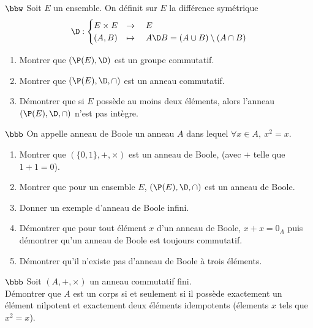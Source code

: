 \documentclass[11pt]{article}
\begin{document}
\pagebreak

\begin{exercice}{$\bbw$}{}
    Soit $E$ un ensemble. On définit sur $E$ la différence symétrique
    \begin{equation*}
        \D : \begin{cases}
            E \times E &\to \quad E\\
            (A,B) &\mapsto \quad A\D B = (A\cup B) \setminus (A \cap B) 
        \end{cases}
    \end{equation*}
    \begin{enumerate}
        \item Montrer que $(\P(E),\D)$ est un groupe commutatif.
        \item Montrer que $(\P(E),\D,\cap)$ est un anneau commutatif.
        \item Démontrer que si $E$ possède au moins deux éléments, alors l'anneau $(\P(E),\D,\cap)$ n'est pas intègre.
    \end{enumerate}
\end{exercice}

\begin{exercice}{$\bbb$}{}
    On appelle anneau de Boole un anneau $A$ dans lequel $\forall x \in A, ~ x^2 = x$.
    \begin{enumerate}
        \item Montrer que $(\{0,1\},+,\times)$ est un anneau de Boole, (avec $+$ telle que $1+1=0$).
        \item Montrer que pour un ensemble $E$, $(\P(E),\D,\cap)$ est un anneau de Boole.
        \item Donner un exemple d'anneau de Boole infini.
        \item Démontrer que pour tout élément $x$ d'un anneau de Boole, $x+x=0_A$ puis démontrer qu'un anneau de Boole est toujours commutatif.
        \item Démontrer qu'il n'existe pas d'anneau de Boole à trois éléments.
    \end{enumerate}
\end{exercice}

\begin{exercice}{$\bbb$}{}
    Soit $(A,+,\times)$ un anneau commutatif fini.\\
    Démontrer que $A$ est un corps si et seulement si il possède exactement un élément nilpotent et exactement deux éléments idempotents (élements $x$ tels que $x^2=x$).
\end{exercice}
\end{document}
